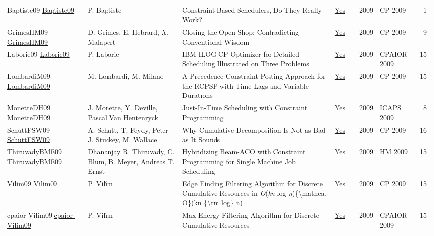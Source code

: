 {\begin{longtable}{p{3cm}p{6cm}p{7cm}rrrp{3cm}r}
Baptiste09 \href{https://doi.org/10.1007/978-3-642-04244-7\_1}{Baptiste09} & P. Baptiste & Constraint-Based Schedulers, Do They Really Work? & \href{papers/Baptiste09.pdf}{Yes} & \cite{Baptiste09} & 2009 & CP 2009 & 1\\
GrimesHM09 \href{https://doi.org/10.1007/978-3-642-04244-7\_33}{GrimesHM09} & D. Grimes, E. Hebrard, A. Malapert & Closing the Open Shop: Contradicting Conventional Wisdom & \href{papers/GrimesHM09.pdf}{Yes} & \cite{GrimesHM09} & 2009 & CP 2009 & 9\\
Laborie09 \href{https://doi.org/10.1007/978-3-642-01929-6\_12}{Laborie09} & P. Laborie & {IBM} {ILOG} {CP} Optimizer for Detailed Scheduling Illustrated on Three Problems & \href{papers/Laborie09.pdf}{Yes} & \cite{Laborie09} & 2009 & CPAIOR 2009 & 15\\
LombardiM09 \href{https://doi.org/10.1007/978-3-642-04244-7\_45}{LombardiM09} & M. Lombardi, M. Milano & A Precedence Constraint Posting Approach for the {RCPSP} with Time Lags and Variable Durations & \href{papers/LombardiM09.pdf}{Yes} & \cite{LombardiM09} & 2009 & CP 2009 & 15\\
MonetteDH09 \href{http://aaai.org/ocs/index.php/ICAPS/ICAPS09/paper/view/712}{MonetteDH09} & J. Monette, Y. Deville, Pascal Van Hentenryck & Just-In-Time Scheduling with Constraint Programming & \href{papers/MonetteDH09.pdf}{Yes} & \cite{MonetteDH09} & 2009 & ICAPS 2009 & 8\\
SchuttFSW09 \href{https://doi.org/10.1007/978-3-642-04244-7\_58}{SchuttFSW09} & A. Schutt, T. Feydy, Peter J. Stuckey, M. Wallace & Why Cumulative Decomposition Is Not as Bad as It Sounds & \href{papers/SchuttFSW09.pdf}{Yes} & \cite{SchuttFSW09} & 2009 & CP 2009 & 16\\
ThiruvadyBME09 \href{https://doi.org/10.1007/978-3-642-04918-7\_3}{ThiruvadyBME09} & Dhananjay R. Thiruvady, C. Blum, B. Meyer, Andreas T. Ernst & Hybridizing Beam-ACO with Constraint Programming for Single Machine Job Scheduling & \href{papers/ThiruvadyBME09.pdf}{Yes} & \cite{ThiruvadyBME09} & 2009 & HM 2009 & 15\\
Vilim09 \href{https://doi.org/10.1007/978-3-642-04244-7\_62}{Vilim09} & P. Vil{\'{\i}}m & Edge Finding Filtering Algorithm for Discrete Cumulative Resources in \emph{O}(\emph{kn} log \emph{n})\{{\textbackslash}mathcal O\}(kn \{{\textbackslash}rm log\} n) & \href{papers/Vilim09.pdf}{Yes} & \cite{Vilim09} & 2009 & CP 2009 & 15\\
cpaior-Vilim09 \href{https://doi.org/10.1007/978-3-642-01929-6\_22}{cpaior-Vilim09} & P. Vil{\'{\i}}m & Max Energy Filtering Algorithm for Discrete Cumulative Resources & \href{papers/cpaior-Vilim09.pdf}{Yes} & \cite{cpaior-Vilim09} & 2009 & CPAIOR 2009 & 15\\

\end{longtable}}
